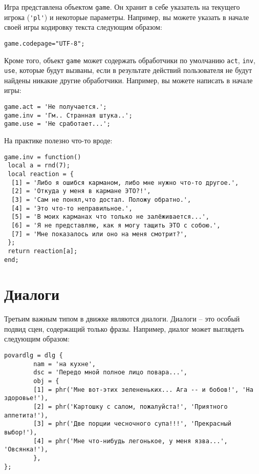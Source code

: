 \documentclass[a4paper,12pt]{article}
\begin{document}
Игра представлена объектом \verb/game/. Он хранит в себе указатель на текущего игрока (\verb/'pl'/) и некоторые параметры. Например, вы можете указать в начале своей игры кодировку текста следующим образом:

\begin{verbatim}
game.codepage="UTF-8";
\end{verbatim}

Кроме того, объект \verb/game/ может содержать обработчики по умолчанию \verb/act/, \verb/inv/, \verb/use/, которые будут вызваны, если в результате действий пользователя не будут найдены никакие другие обработчики. Например, вы можете написать в начале игры:

\begin{verbatim}
game.act = 'Не получается.';
game.inv = 'Гм.. Странная штука..';
game.use = 'Не сработает...';
\end{verbatim}

На практике полезно что-то вроде:

\begin{verbatim}
game.inv = function()
 local a = rnd(7);
 local reaction = {
  [1] = 'Либо я ошибся карманом, либо мне нужно что-то другое.',
  [2] = 'Откуда у меня в кармане ЭТО?!',
  [3] = 'Сам не понял,что достал. Положу обратно.',
  [4] = 'Это что-то неправильное.',
  [5] = 'В моих карманах что только не залёживается...',
  [6] = 'Я не представляю, как я могу тащить ЭТО с собою.',
  [7] = 'Мне показалось или оно на меня смотрит?',
 };
 return reaction[a];
end;
\end{verbatim}

\section{Диалоги}

Третьим важным типом в движке являются диалоги. Диалоги -- это особый подвид сцен, содержащий только фразы. Например, диалог может выглядеть следующим образом:

\begin{verbatim}
povardlg = dlg {
        nam = 'на кухне',
        dsc = 'Передо мной полное лицо повара...',
        obj = {
        [1] = phr('Мне вот-этих зелененьких... Ага -- и бобов!', 'На здоровье!'),
        [2] = phr('Картошку с салом, пожалуйста!', 'Приятного аппетита!'),
        [3] = phr('Две порции чесночного супа!!!', 'Прекрасный выбор!'),
        [4] = phr('Мне что-нибудь легонькое, у меня язва...', 'Овсянка!'),
        },
};
\end{verbatim}
\end{document}
